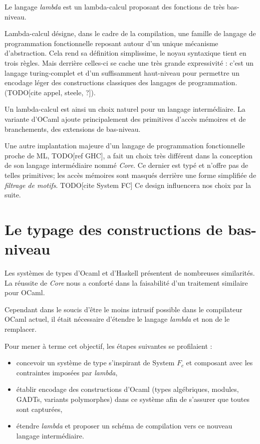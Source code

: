 \documentclass[12pt]{report}
\newcommand\todo[1]{TODO[#1]}
\begin{document}
Le langage \emph{lambda} est un lambda-calcul proposant des fonctions de très
bas-niveau.

Lambda-calcul désigne, dans le cadre de la compilation, une famille de
langage de programmation fonctionnelle reposant autour d'un unique mécanisme
d'abstraction.
Cela rend sa définition simplissime, le noyau syntaxique tient en trois règles.
Mais derrière celles-ci se cache une très grande expressivité :
c'est un langage turing-complet et d'un suffisamment haut-niveau pour permettre
un encodage léger des constructions classiques des langages de programmation.
(\todo{cite appel, steele, ?}).

Un lambda-calcul est ainsi un choix naturel pour un langage intermédiaire. La
variante d'OCaml ajoute principalement des primitives d'accès mémoires et de
branchements, des extensions de bas-niveau.

Une autre implantation majeure d'un langage de programmation fonctionnelle
proche de ML, \todo{ref GHC}, a fait un choix très différent dans la conception
de son langage intermédiaire nommé \emph{Core}.
Ce dernier est typé et n'offre pas de telles primitives; les accès mémoires
sont masqués derrière une forme simplifiée de \emph{filtrage de motifs}.
\todo{cite System FC} Ce design influencera nos choix par la suite.

\section{Le typage des constructions de bas-niveau}

Les systèmes de types d'Ocaml et d'Haskell présentent de nombreuses
similarités. La réussite de \emph{Core} nous a conforté dans la faisabilité
d'un traitement similaire pour OCaml.

Cependant dans le soucis d'être le moins intrusif possible dans le compilateur
OCaml actuel, il était nécessaire d'étendre le langage \emph{lambda} et non de
le remplacer.

Pour mener à terme cet objectif, les étapes suivantes se profilaient :
\begin{itemize}
  \item concevoir un système de type s'inspirant de System $F_c$ et composant
    avec les contraintes imposées par \emph{lambda},
  \item établir encodage des constructions d'Ocaml (types algébriques, modules,
    GADTs, variants polymorphes) dans ce système afin de s'assurer que toutes
    sont capturées,
  \item étendre \emph{lambda} et proposer un schéma de compilation vers ce
    nouveau langage intermédiaire.
\end{itemize}
\end{document}
